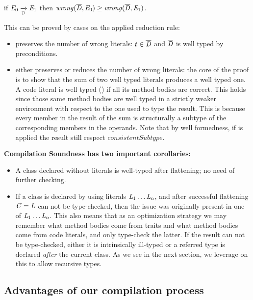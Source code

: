 \begin{theorem}

if $\mE_0 \xrightarrow[\smallDs]{} \mE_1$
then $\mathit{wrong}(\overline{\mathit{D}},\mathit{E}_0)\geq\mathit{wrong}(\overline{\mathit{D}},\mathit{E}_1)$.
\end{theorem}
\saveSpace\saveSpace\saveSpace
\noindent This can be proved by cases on the applied reduction rule:
\begin{itemize}
\item
{} preserves the number of wrong literals:
$t \in \overline{\mathit{D}}$ and $\overline{\mathit{D}}$ is well typed by  preconditions.
\item {} either preserves or reduces the number of
wrong literals:
the core of the proof is to show that the sum of two well typed literals produces a well typed one.
A code literal is well typed () if all its method bodies are correct.
This holds since those same method bodies
are well typed in a strictly weaker environment with respect to the one used to type the result.
This is because every member in the result of the sum
is structurally a subtype of
the corresponding members in the operands.
Note that by well formedness, if 
is applied the result still respect 
$\mathit{consistentSubtype}$.
\end{itemize}
\noindent 
\textbf{Compilation Soundness has two important corollaries:}
\begin{itemize}
\item A class declared without literals
is well-typed after flattening; no need of further checking.
\item If a class is declared by using literals $\mathit{L}_1\ldots\mathit{L}_n$, and after successful flattening $\mathit{C} = \mathit{L}$ can not be type-checked,
then the issue was originally present in one of $\mathit{L}_1\ldots\mathit{L}_n$.
This also means that as an optimization strategy
 we may remember what method bodies come from traits and what method bodies come from code literals, and only type-check the latter.
If the result can not be type-checked, either it is intrinsically ill-typed or a 
referred type is declared \emph{after} the current class. 
As we see in the next section, we leverage on this 
to allow recursive types.
 \end{itemize}





\saveSpace
\subsection{Advantages of our compilation process}
\saveSpace

